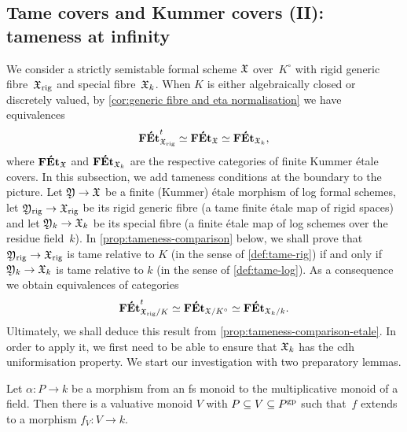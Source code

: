 \subsection{Tame covers and Kummer covers (II): tameness at infinity}
\label{ss:tameness-comparison}

We consider a  strictly semistable formal scheme ${\mathfrak{X}}$ over~$K^\circ$ with rigid generic fibre~${\mathfrak{X}}_{\rm rig}$ and special fibre~${\mathfrak{X}}_k$.
When  $K$ is either algebraically closed or discretely valued, by \cref{cor:generic fibre and eta normalisation} 
we have equivalences
\[
 \mathbf{F\acute{E}t}^t_{{\mathfrak{X}}_{\rm rig}} \simeq \mathbf{F\acute{E}t}_{\mathfrak{X}} \simeq \mathbf{F\acute{E}t}_{{\mathfrak{X}}_k},
\]
where $\mathbf{F\acute{E}t}_{\mathfrak{X}}$ and $\mathbf{F\acute{E}t}_{{\mathfrak{X}}_k}$ are the respective categories of finite Kummer \'etale covers.
In this subsection, we add tameness conditions at the boundary to the picture.
Let ${\mathfrak{Y}} \to {\mathfrak{X}}$ be a finite (Kummer) étale morphism of log formal schemes, let ${\mathfrak{Y}}_{\rm rig} \to {\mathfrak{X}}_{\rm rig}$ be its rigid generic fibre (a tame finite étale map of rigid spaces) and let ${\mathfrak{Y}}_k \to {\mathfrak{X}}_k$ be its special fibre (a finite \'etale map of log schemes over the residue field~$k$). In \cref{prop:tameness-comparison} below, we shall prove that ${\mathfrak{Y}}_{\rm rig} \to {\mathfrak{X}}_{\rm rig}$ is tame relative to $K$ (in the sense of \cref{def:tame-rig}) if and only if ${\mathfrak{Y}}_k\to {\mathfrak{X}}_k$ is tame relative to $k$ (in the sense of \cref{def:tame-log}).
As a consequence we obtain equivalences of categories
\[
 \mathbf{F\acute{E}t}^t_{{\mathfrak{X}}_{\rm rig}/K} \simeq \mathbf{F\acute{E}t}_{{\mathfrak{X}}/K^\circ} \simeq \mathbf{F\acute{E}t}_{{\mathfrak{X}}_k/k}.
\]
Ultimately, we shall deduce this result from \cref{prop:tameness-comparison-etale}. In order to apply it, we first need to be able to ensure that ${\mathfrak{X}}_k$ has the cdh uniformisation property.
We start our investigation with two preparatory lemmas.

\begin{lem} \label{lem:extend-valuative}
    Let $\alpha \colon P \to k$ be a morphism from an fs monoid to the multiplicative monoid of a field.
    Then there is a valuative monoid $V$ with $P \subseteq V \subseteq P^{\rm gp}$ such that~$f$ extends to a morphism $f_V \colon V \to k$.
\end{lem}

